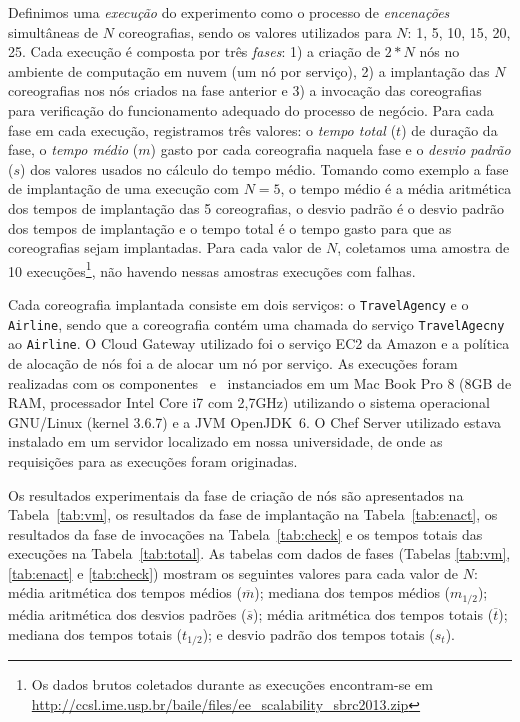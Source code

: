 Definimos uma \emph{execução} do experimento como o processo de \emph{encenações} simultâneas de $N$ coreografias, sendo os valores utilizados para $N$: 1, 5, 10, 15, 20, 25. Cada execução é composta por três \emph{fases}: 1) a criação de $2*N$ nós no ambiente de computação em nuvem (um nó por serviço), 2) a implantação das $N$ coreografias nos nós criados na fase anterior e 3) a invocação das coreografias para verificação do funcionamento adequado do processo de negócio. Para cada fase em cada execução, registramos três valores: o \emph{tempo total} ($t$) de duração da fase, o \emph{tempo médio} ($m$) gasto por cada coreografia naquela fase e o \emph{desvio padrão} ($s$) dos valores usados no cálculo do tempo médio. Tomando como exemplo a fase de implantação de uma execução com $N=5$, o tempo médio é a média aritmética dos tempos de implantação das 5 coreografias, o desvio padrão é o desvio padrão dos tempos de implantação e o tempo total é o tempo gasto para que as coreografias sejam implantadas. Para cada valor de $N$, coletamos uma amostra de 10 execuções\footnote{Os dados brutos coletados durante as execuções encontram-se em \\ \url{http://ccsl.ime.usp.br/baile/files/ee_scalability_sbrc2013.zip}}, não havendo nessas amostras execuções com falhas. 

Cada coreografia implantada consiste em dois serviços: o \texttt{TravelAgency} e o \texttt{Airline}, sendo que a coreografia contém uma chamada do serviço \texttt{TravelAgecny} ao \texttt{Airline}. O Cloud Gateway utilizado foi o serviço EC2 da Amazon e a política de alocação de nós foi a de alocar um nó por serviço. As execuções foram realizadas com os componentes \eecomp\ e \dm\ instanciados em um Mac Book Pro 8 (8GB de RAM, processador Intel Core i7 com 2,7GHz) utilizando o sistema operacional GNU/Linux (kernel 3.6.7) e a JVM OpenJDK~6. O Chef Server utilizado estava instalado em um servidor localizado em nossa universidade, de onde as requisições para as execuções foram originadas. 

Os resultados experimentais da fase de criação de nós são apresentados na Tabela~\ref{tab:vm}, os resultados da fase de implantação na Tabela~\ref{tab:enact}, os resultados da fase de invocações na Tabela~\ref{tab:check} e os tempos totais das execuções na Tabela~\ref{tab:total}. As tabelas com dados de fases (Tabelas \ref{tab:vm}, \ref{tab:enact} e \ref{tab:check}) mostram os seguintes valores para cada valor de $N$: média aritmética dos tempos médios ($\overline{m}$); mediana dos tempos médios ($m_{1/2}$); média aritmética dos desvios padrões (${\overline{s}}$); média aritmética dos tempos totais ($\overline{t}$); mediana dos tempos totais ($t_{1/2}$); e desvio padrão dos tempos totais ($s_t$). 

